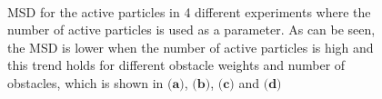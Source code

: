 


\begin{figure}[htbp]
\centering
\\
\caption{MSD for the active particles in 4 different experiments where the number of 
active particles is used as a parameter. As can be seen, the MSD is lower when the number
of active particles is high and this trend holds for different obstacle weights and number of obstacles, 
which is shown in $\textbf{(a)}$, $\textbf{(b)}$, $\textbf{(c)}$ and $\textbf{(d)}$} 
\label{fig:msd_NB}
\end{figure}

